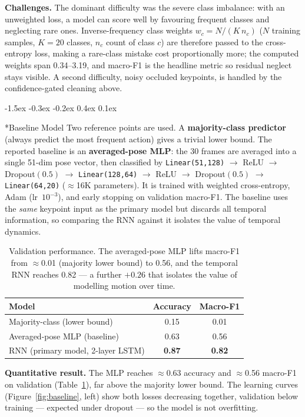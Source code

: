 \documentclass[final]{article}
\makeatletter
\renewcommand{\section}{%
  \@startsection{section}{1}{\z@}%
                {-1.5ex \@plus -0.3ex \@minus -0.2ex}%
                {0.4ex \@plus 0.1ex}%
                {\large\bf\raggedright}%
}
\makeatother
\begin{document}
\textbf{Challenges.} The dominant difficulty was the severe class imbalance: with an unweighted loss, a model can score well by favouring frequent classes and neglecting rare ones. Inverse-frequency class weights $w_c = N/(K\,n_c)$ ($N$ training samples, $K{=}20$ classes, $n_c$ count of class $c$) are therefore passed to the cross-entropy loss, making a rare-class mistake cost proportionally more; the computed weights span 0.34--3.19, and macro-F1 is the headline metric so residual neglect stays visible. A second difficulty, noisy occluded keypoints, is handled by the confidence-gated cleaning above.

\section*{Baseline Model}
Two reference points are used. A \textbf{majority-class predictor} (always predict the most frequent action) gives a trivial lower bound. The reported baseline is an \textbf{averaged-pose MLP}: the 30 frames are averaged into a single 51-dim pose vector, then classified by \texttt{Linear(51,128)} $\to$ ReLU $\to$ Dropout$(0.5)$ $\to$ \texttt{Linear(128,64)} $\to$ ReLU $\to$ Dropout$(0.5)$ $\to$ \texttt{Linear(64,20)} ($\approx$16K parameters). It is trained with weighted cross-entropy, Adam (lr~$10^{-3}$), and early stopping on validation macro-F1. The baseline uses the \emph{same} keypoint input as the primary model but discards all temporal information, so comparing the RNN against it isolates the value of temporal dynamics.

\begin{table}[!h]
\centering\small
\begin{tabular}{lcc}
\toprule
Model & Accuracy & Macro-F1 \\
\midrule
Majority-class (lower bound) & 0.15 & 0.01 \\
Averaged-pose MLP (baseline) & 0.63 & 0.56 \\
\midrule
RNN (primary model, 2-layer LSTM) & \textbf{0.87} & \textbf{0.82} \\
\bottomrule
\end{tabular}
\caption{Validation performance. The averaged-pose MLP lifts macro-F1 from $\approx$0.01 (majority lower bound) to 0.56, and the temporal RNN reaches 0.82 --- a further $+0.26$ that isolates the value of modelling motion over time.}
\label{tab:results}
\end{table}

\textbf{Quantitative result.} The MLP reaches $\approx$0.63 accuracy and $\approx$0.56 macro-F1 on validation (Table~\ref{tab:results}), far above the majority lower bound. The learning curves (Figure~\ref{fig:baseline}, left) show both losses decreasing together, validation below training --- expected under dropout --- so the model is not overfitting.
\end{document}

